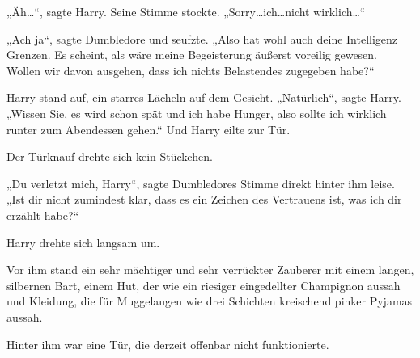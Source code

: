 „Äh…“, sagte Harry. Seine Stimme stockte. „Sorry…ich…nicht wirklich…“

„Ach ja“, sagte Dumbledore und seufzte. „Also hat wohl auch deine Intelligenz Grenzen. Es scheint, als wäre meine Begeisterung äußerst voreilig gewesen. Wollen wir davon ausgehen, dass ich nichts Belastendes zugegeben habe?“

Harry stand auf, ein starres Lächeln auf dem Gesicht. „Natürlich“, sagte Harry. „Wissen Sie, es wird schon spät und ich habe Hunger, also sollte ich wirklich runter zum Abendessen gehen.“ Und Harry eilte zur Tür.

Der Türknauf drehte sich kein Stückchen.

„Du verletzt mich, Harry“, sagte Dumbledores Stimme direkt hinter ihm leise. „Ist dir nicht zumindest klar, dass es ein Zeichen des Vertrauens ist, was ich dir erzählt habe?“

Harry drehte sich langsam um.

Vor ihm stand ein sehr mächtiger und sehr verrückter Zauberer mit einem langen, silbernen Bart, einem Hut, der wie ein riesiger eingedellter Champignon aussah und Kleidung, die für Muggelaugen wie drei Schichten kreischend pinker Pyjamas aussah.

Hinter ihm war eine Tür, die derzeit offenbar nicht funktionierte.

